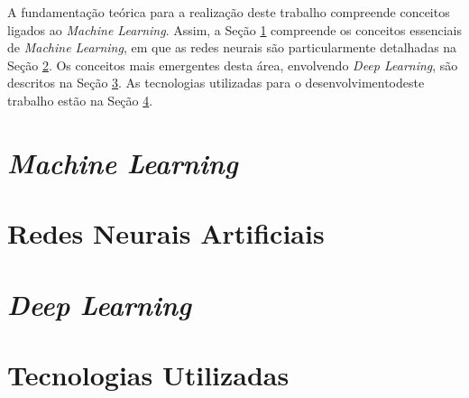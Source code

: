 
A fundamentação teórica para a realização deste trabalho compreende conceitos ligados ao \emph{Machine Learning}. Assim, a Seção \ref{sec:machineLearning} compreende os conceitos essenciais de \emph{Machine Learning}, em que as redes neurais são particularmente detalhadas na Seção \ref{sec:rnas}. Os conceitos mais emergentes desta área, envolvendo \emph{Deep Learning}, são descritos na Seção \ref{sec:dl}. As tecnologias utilizadas para o desenvolvimentodeste trabalho estão na Seção \ref{sec:tecs}.

\section{\emph{Machine Learning}} \label{sec:machineLearning}


\section{Redes Neurais Artificiais} \label{sec:rnas}


\section{\emph{Deep Learning}}\label{sec:dl}


\section{Tecnologias Utilizadas}\label{sec:tecs}

